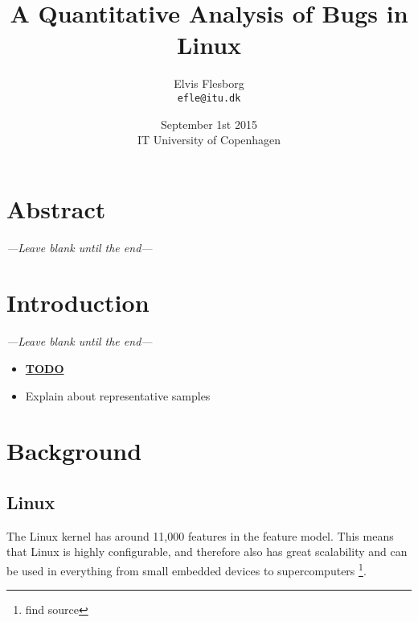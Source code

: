\documentclass[a4paper,11pt]{article}
\begin{document}
\setlength{\parindent}{0cm}
\setlength{\unitlength}{1mm}

\date{September 1st 2015\\ IT University of Copenhagen}
\title{A Quantitative Analysis of Bugs in Linux}
\author{Elvis Flesborg\\
\texttt{efle@itu.dk}}
\clearpage\maketitle
\thispagestyle{empty}
\newpage

\tableofcontents
\thispagestyle{empty}



\newpage

\setcounter{page}{1}

\section{Abstract}
\emph{---Leave blank until the end---}

\section{Introduction}
\emph{---Leave blank until the end---}


\begin{itemize}
    \item \underline{\textbf{TODO}}
        \item Explain about representative samples
\end{itemize}


\newpage
\section{Background}

\subsection{Linux}

The Linux kernel has around 11,000 features in the feature model. This means 
that Linux is highly configurable, and therefore also has great scalability 
and can be used in everything from small embedded devices to supercomputers 
\footnote{find source}.
\end{document}

